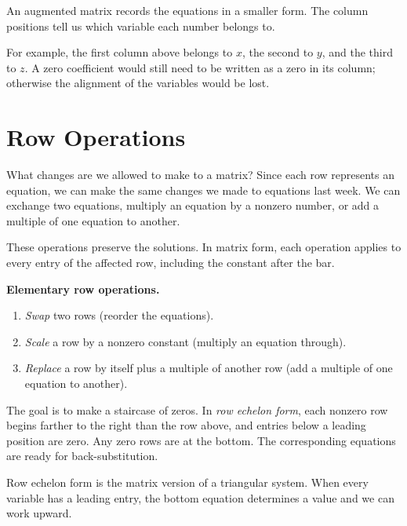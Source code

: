 \documentclass[12pt]{book}
\begin{document}
\begin{keyidea}
An augmented matrix records the equations in a smaller form.
The column positions tell us which variable each number belongs to.
\end{keyidea}

For example, the first column above belongs to $x$, the second to $y$, and the third
to $z$. A zero coefficient would still need to be written as a zero in its column;
otherwise the alignment of the variables would be lost.

\section{Row Operations}

What changes are we allowed to make to a matrix? Since each row
represents an equation, we can make the same changes we made
to equations last week. We can exchange two equations, multiply
an equation by a nonzero number, or add a multiple of one
equation to another.

These operations preserve the solutions. In matrix form, each
operation applies to every entry of the affected row, including
the constant after the bar.

\begin{keyidea}
\textbf{Elementary row operations.}
\begin{enumerate}\setlength{\itemsep}{2pt}
  \item \emph{Swap} two rows (reorder the equations).
  \item \emph{Scale} a row by a nonzero constant (multiply an equation through).
  \item \emph{Replace} a row by itself plus a multiple of another row (add a multiple
        of one equation to another).
\end{enumerate}
\end{keyidea}

The goal is to make a staircase of zeros. In \emph{row echelon form},
each nonzero row begins farther to the right than the row above,
and entries below a leading position are zero. Any zero rows
are at the bottom. The corresponding equations are ready
for back-substitution.

\begin{visual}
Row echelon form is the matrix version of a triangular system.
When every variable has a leading entry, the bottom equation
determines a value and we can work upward.
\end{visual}
\end{document}
